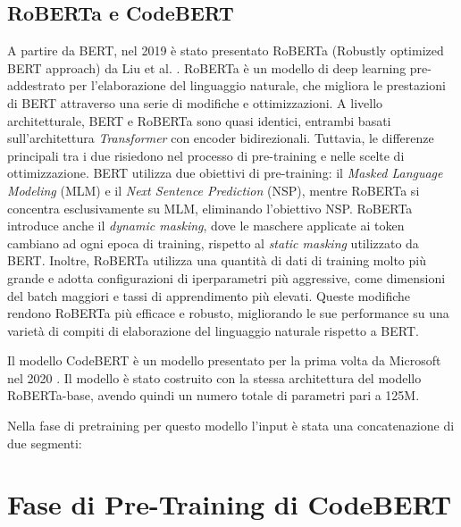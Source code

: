 \documentclass[../../Thesis.tex]{subfiles}
\begin{document}
\subsection{RoBERTa e CodeBERT}
A partire da BERT, nel 2019 è stato presentato RoBERTa (Robustly optimized BERT approach) da Liu et al. \cite{RoBERTa}. RoBERTa è un modello di deep learning pre-addestrato per l'elaborazione del linguaggio naturale, che migliora le prestazioni di BERT attraverso una serie di modifiche e ottimizzazioni. A livello architetturale, BERT e RoBERTa sono quasi identici, entrambi basati sull'architettura \textit{Transformer} con encoder bidirezionali. Tuttavia, le differenze principali tra i due risiedono nel processo di pre-training e nelle scelte di ottimizzazione. BERT utilizza due obiettivi di pre-training: il \textit{Masked Language Modeling} (MLM) e il \textit{Next Sentence Prediction} (NSP), mentre RoBERTa si concentra esclusivamente su MLM, eliminando l'obiettivo NSP. RoBERTa introduce anche il \textit{dynamic masking}, dove le maschere applicate ai token cambiano ad ogni epoca di training, rispetto al \textit{static masking} utilizzato da BERT. Inoltre, RoBERTa utilizza una quantità di dati di training molto più grande e adotta configurazioni di iperparametri più aggressive, come dimensioni del batch maggiori e tassi di apprendimento più elevati. Queste modifiche rendono RoBERTa più efficace e robusto, migliorando le sue performance su una varietà di compiti di elaborazione del linguaggio naturale rispetto a BERT.


Il modello CodeBERT è un modello presentato per la prima volta da Microsoft nel 2020 \cite{CodeBERT}. Il modello è stato costruito con la stessa architettura del modello RoBERTa-base, avendo quindi un numero totale di parametri pari a 125M. 

Nella fase di pretraining per questo modello l'input è stata una concatenazione di due segmenti: 

\section{Fase di Pre-Training di CodeBERT}
\end{document}
